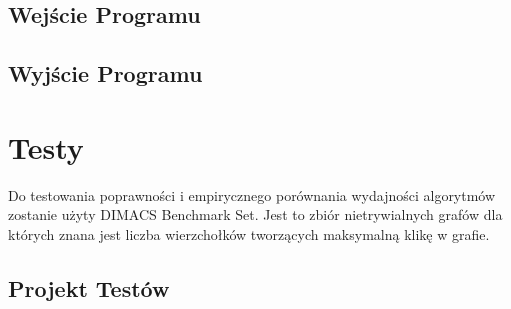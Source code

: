 \documentclass[12pt, a4paper]{article}
\begin{document}
\subsection{Wejście Programu}

\subsection{Wyjście Programu}

\section{Testy}
\label{sec-4}
Do testowania poprawności i empirycznego porównania wydajności algorytmów zostanie użyty DIMACS Benchmark Set\citep{dimacs}. Jest to zbiór nietrywialnych grafów dla których znana jest liczba wierzchołków tworzących maksymalną klikę w grafie.

\subsection{Projekt Testów}

\nocite{*}


\end{document}
